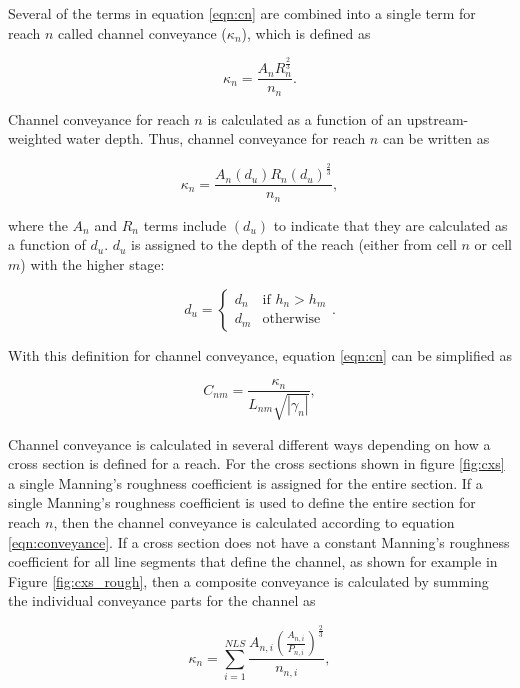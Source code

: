 \documentclass[fleqn]{article}
\begin{document}
Several of the terms in equation \ref{eqn:cn} are combined into a single term for reach $n$ called channel conveyance ($\kappa_n$), which is defined as

\begin{equation}
  \kappa_n = \frac{A_n R_n^{\frac{2}{3}}}{n_n}.
\label{eqn:conveyance}
\end{equation}

\noindent Channel conveyance for reach $n$ is calculated as a function of an upstream-weighted water depth.  Thus, channel conveyance for reach $n$ can be written as

\begin{equation}
  \kappa_n = \frac{A_n (d_u) R_n (d_u) ^{\frac{2}{3}}}{n_n},
\label{eqn:conveyancedu}
\end{equation}

\noindent where the $A_n$ and $R_n$ terms include $(d_u)$ to indicate that they are calculated as a function of $d_u$.  $d_u$ is assigned to the depth of the reach (either from cell $n$ or cell $m$) with the higher stage:

\[
d_u = 
\begin{cases}
  d_n & \text{if $h_n>h_m$} \\
  d_m & \text{otherwise}
\end{cases}.
\]

With this definition for channel conveyance, equation \ref{eqn:cn} can be simplified as

\begin{equation}
  C_{nm} = 
  \frac{
  \kappa_n 
  }
  {
  L_{nm}
  \sqrt{| \gamma_n |}
  },
\label{eqn:cn2}
\end{equation}

Channel conveyance is calculated in several different ways depending on how a cross section is defined for a reach.  For the cross sections shown in figure \ref{fig:cxs} a single Manning's roughness coefficient is assigned for the entire section.  If a single Manning's roughness coefficient is used to define the entire section for reach $n$, then the channel conveyance is calculated according to equation \ref{eqn:conveyance}.  If a cross section does not have a constant Manning's roughness coefficient for all line segments that define the channel, as shown for example in Figure \ref{fig:cxs_rough}, then a composite conveyance is calculated by summing the individual conveyance parts for the channel as

\begin{equation}
  \kappa_n = \sum_{i=1}^{NLS} \frac{A_{n,i} \left ( \frac {A_{n,i}}{P_{n,i}}\right )^{\frac{2}{3}}}{n_{n,i}},
\end{equation}
\end{document}
